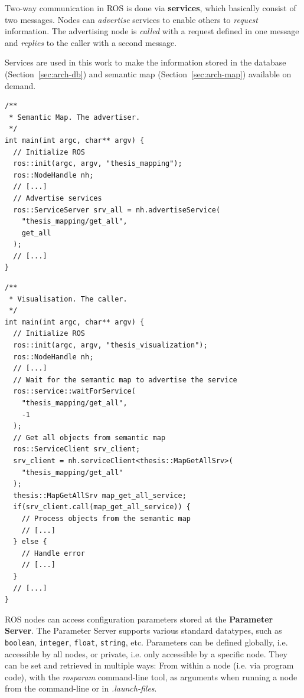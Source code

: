 Two-way communication in ROS is done via \textbf{services}, which basically consist of two messages. Nodes can \textit{advertise} services to enable others to \textit{request} information. The advertising node is \textit{called} with a request defined in one message and \textit{replies} to the caller with a second message.

Services are used in this work to make the information stored in the database (Section~\ref{sec:arch-db}) and semantic map (Section~\ref{sec:arch-map}) available on demand.

\begin{lstlisting}[caption=An example for the use of ROS services in this work. The semantic map enables others to get memorized objects.]
/**
 * Semantic Map. The advertiser.
 */
int main(int argc, char** argv) {
  // Initialize ROS
  ros::init(argc, argv, "thesis_mapping");
  ros::NodeHandle nh;
  // [...]
  // Advertise services
  ros::ServiceServer srv_all = nh.advertiseService(
    "thesis_mapping/get_all",
    get_all
  );
  // [...]
}
\end{lstlisting}

\begin{lstlisting}[caption=An example for the use of ROS services in this work. The visualisation gets all objects memorized by the semantic map.]
/**
 * Visualisation. The caller.
 */
int main(int argc, char** argv) {
  // Initialize ROS
  ros::init(argc, argv, "thesis_visualization");
  ros::NodeHandle nh;
  // [...]
  // Wait for the semantic map to advertise the service
  ros::service::waitForService(
    "thesis_mapping/get_all",
    -1
  );
  // Get all objects from semantic map
  ros::ServiceClient srv_client;
  srv_client = nh.serviceClient<thesis::MapGetAllSrv>(
    "thesis_mapping/get_all"
  );
  thesis::MapGetAllSrv map_get_all_service;
  if(srv_client.call(map_get_all_service)) {
    // Process objects from the semantic map
    // [...]
  } else {
    // Handle error
    // [...]
  }
  // [...]
}
\end{lstlisting}

ROS nodes can access configuration parameters stored at the \textbf{Parameter Server}. The Parameter Server supports various standard datatypes, such as \texttt{boolean}, \texttt{integer}, \texttt{float}, \texttt{string}, etc. Parameters can be defined globally, i.e. accessible by all nodes, or private, i.e. only accessible by a specific node. They can be set and retrieved in multiple ways: From within a node (i.e. via program code), with the \textit{rosparam} command-line tool, as arguments when running a node from the command-line or in \textit{.launch-files}. \\

